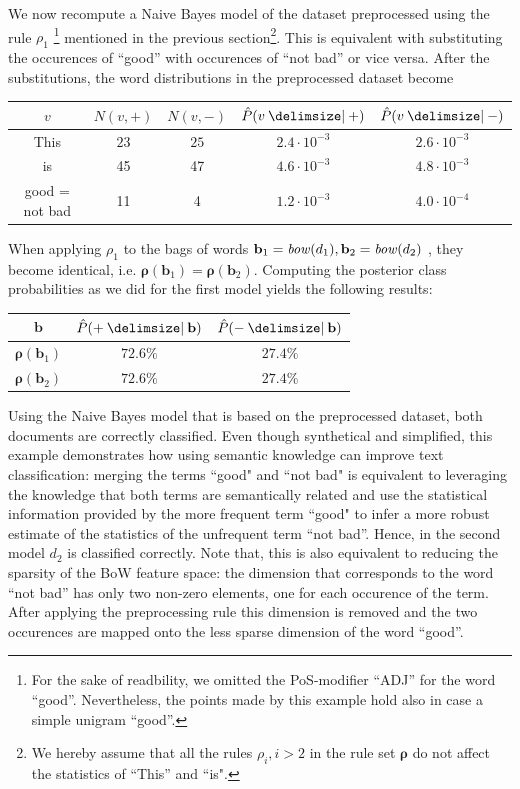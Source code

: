 We now recompute a Naive Bayes model of the dataset preprocessed using the rule
$\rho_1$ \footnote{For the sake of readbility, we omitted the PoS-modifier
``ADJ'' for the word ``good''. Nevertheless, the points made by this example
hold also in case a simple unigram ``good''.} mentioned in the previous
section\footnote{We hereby assume that all the rules $\rho_i, i >2$ in the rule set $\boldsymbol \rho$ do not affect the statistics of ``This'' and ``is".}. This is equivalent with substituting the occurences of ``good'' with occurences of ``not bad'' or
vice versa.
After the substitutions, the word distributions in the preprocessed
dataset become

\begin{center}
\begin{tabular}{|c|c|c|c|c}
$v$ & $N(v, +)$ & $N(v,-)$ & $\hat{P}(v\given +)$ & $\hat{P}(v \given -)$ \\
\hline
This & $23$ & $25$ & $2.4\cdot 10^{-3}$  & $2.6 \cdot 10^{-3}$\\
is & 45 & 47 & $4.6\cdot 10^{-3}$ &  $4.8\cdot 10^{-3}$ \\
good = not bad& 11 & 4 & $1.2 \cdot 10^{-3}$ & $4.0 \cdot 10^{-4}$ \\
\end{tabular}
\end{center}


When applying $\rho_1$ to the bags of words $\mathbf{b}_1 = \mathit{bow}(d_1),
\mathbf{b}_2=\mathit{bow}(d_2)$ , they become identical, i.e.
$\boldsymbol \rho(\mathbf{b}_1) = \boldsymbol \rho(\mathbf{b}_2)$.  Computing the posterior class probabilities as we did for the first
model yields the following results:

\begin{center}
\begin{tabular}{c|c|c}
$\mathbf{b}$ & $\hat{P}(+ \given \mathbf{b})$ & $\hat{P}(- \given \mathbf{b})$ \\
\hline
$\boldsymbol \rho(\mathbf{b}_1)$ & $72.6 \%$ & $27.4 \%$ \\
$\boldsymbol \rho(\mathbf{b}_2)$ & $72.6 \%$ & $27.4 \%$ \\
\end{tabular}
\end{center}

Using the Naive Bayes model that is based on the preprocessed dataset, both
documents are correctly classified. Even though synthetical and simplified, this
example demonstrates how using semantic knowledge can improve text
classification: merging the terms ``good" and ``not bad" is equivalent to
leveraging the knowledge that both terms are semantically related and use
the statistical information provided by the more frequent term
``good" to infer a more robust estimate of the statistics of the unfrequent term ``not bad''.
Hence, in the second model $d_2$ is classified correctly.
Note that, this is also equivalent to reducing the sparsity of the BoW feature
space: the dimension that corresponds to the word ``not bad'' has only two
non-zero elements, one for each occurence of the term. After applying the preprocessing
rule this dimension is removed and the two occurences are mapped onto the less
sparse dimension of the word ``good''.

